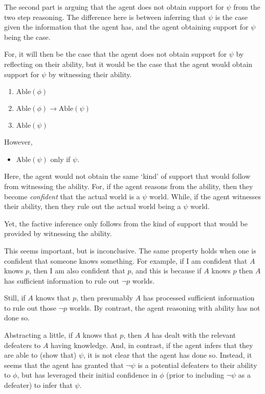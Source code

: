 \documentclass[10pt]{article}
\begin{document}
The second part is arguing that the agent does not obtain support for \(\psi\) from the two step reasoning.
The difference here is between inferring that \(\psi\) is the case given the information that the agent has, and the agent obtaining support for \(\psi\) being the case.

For, it will then be the case that the agent does not obtain support for \(\psi\) by reflecting on their ability, but it would be the case that the agent would obtain support for \(\psi\) by witnessing their ability.

\begin{enumerate}
\item \(\text{Able}(\phi)\)
\item \(\text{Able}(\phi) \rightarrow \text{Able}(\psi)\)
\item \(\text{Able}(\psi)\)
\end{enumerate}
However,
\begin{itemize}
\item \(\text{Able}(\psi)\) only if \(\psi\).
\end{itemize}

Here, the agent would not obtain the same `kind' of support that would follow from witnessing the ability.
For, if the agent reasons from the ability, then they become \emph{confident} that the actual world is a \(\psi\) world.
While, if the agent witnesses their ability, then they rule out the actual world being a \(\psi\) world.

Yet, the factive inference only follows from the kind of support that would be provided by witnessing the ability.

This seems important, but is inconclusive.
The same property holds when one is confident that someone knows something.
For example, if I am confident that \(A\) knows \(p\), then I am also confident that \(p\), and this is because if \(A\) knows \(p\) then \(A\) has sufficient information to rule out \(\lnot p\) worlds.

Still, if \(A\) knows that \(p\), then presumably \(A\) has processed sufficient information to rule out those \(\lnot p\) worlds.
By contrast, the agent reasoning with ability has not done so.

Abstracting a little, if \(A\) knows that \(p\), then \(A\) has dealt with the relevant defeaters to \(A\) having knowledge.
And, in contrast, if the agent infers that they are able to (show that) \(\psi\), it is not clear that the agent has done so.
Instead, it seems that the agent has granted that \(\lnot\psi\) is a potential defeaters to their ability to \(\phi\), but has leveraged their initial confidence in \(\phi\) (prior to including \(\lnot\psi\) as a defeater) to infer that \(\psi\).
\end{document}
